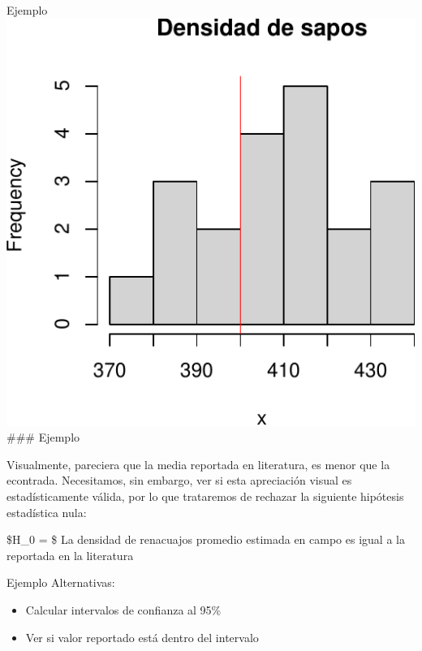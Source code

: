 \documentclass[
  11pt,
  ignorenonframetext,
]{beamer}
\begin{document}
\begin{frame}{Ejemplo}
\protect\hypertarget{ejemplo-4}{}
\includegraphics{Pruebas-hipotesis_files/figure-beamer/unnamed-chunk-1-1.pdf}
\#\#\# Ejemplo

Visualmente, pareciera que la media reportada en literatura, es menor
que la econtrada. Necesitamos, sin embargo, ver si esta apreciación
visual es estadísticamente válida, por lo que trataremos de rechazar la
siguiente hipótesis estadística nula:

\$H\_0 = \$ La densidad de renacuajos promedio estimada en campo es
igual a la reportada en la literatura
\end{frame}

\begin{frame}{Ejemplo}
\protect\hypertarget{ejemplo-5}{}
Alternativas:

\begin{itemize}
\item
  Calcular intervalos de confianza al 95\%
\item
  Ver si valor reportado está dentro del intervalo
\end{itemize}
\end{frame}
\end{document}
